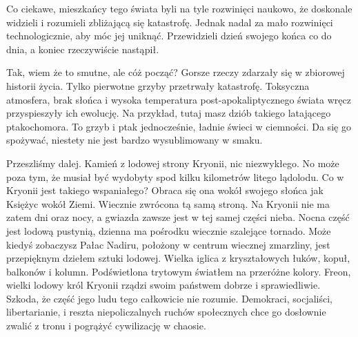 Co ciekawe, mieszkańcy tego świata byli na tyle rozwinięci naukowo, że doskonale widzieli i rozumieli zbliżającą się katastrofę.
Jednak nadal za mało rozwinięci technologicznie, aby móc jej uniknąć.
Przewidzieli dzień swojego końca co do dnia, a koniec rzeczywiście nastąpił.

Tak, wiem że to smutne, ale cóż począć? Gorsze rzeczy zdarzały się w zbiorowej historii życia. 
Tylko pierwotne grzyby przetrwały katastrofę.
Toksyczna atmosfera, brak słońca i wysoka temperatura post-apokaliptycznego świata wręcz przyspieszyły ich ewolucję.
Na przykład, tutaj masz dziób takiego latającego ptakochomora. To grzyb i ptak jednocześnie, ładnie świeci w ciemności.
Da się go spożywać, niestety nie jest bardzo wysublimowany w smaku.

Przeszliśmy dalej. Kamień z lodowej strony Kryonii, nic niezwykłego. 
No może poza tym, że musiał być wydobyty spod kilku kilometrów litego lądolodu.
Co w Kryonii jest takiego wspaniałego? Obraca się ona wokół swojego słońca jak Księżyc wokół Ziemi. 
Wiecznie zwrócona tą samą stroną.
Na Kryonii nie ma zatem dni oraz nocy, a gwiazda zawsze jest w tej samej części nieba.
Nocna część jest lodową pustynią, dzienna ma pośrodku wiecznie szalejące tornado.
Może kiedyś zobaczysz Pałac Nadiru, położony w centrum wiecznej zmarzliny, jest przepięknym dziełem sztuki lodowej.
Wielka iglica z kryształowych łuków, kopuł, balkonów i kolumn.
Podświetlona trytowym światłem na przeróżne kolory.
Freon, wielki lodowy król Kryonii rządzi swoim państwem dobrze i sprawiedliwie.
Szkoda, że część jego ludu tego całkowicie nie rozumie. 
Demokraci, socjaliści, libertarianie, i reszta niepoliczalnych ruchów społecznych chce go dosłownie zwalić z tronu i pogrążyć cywilizację w chaosie.

